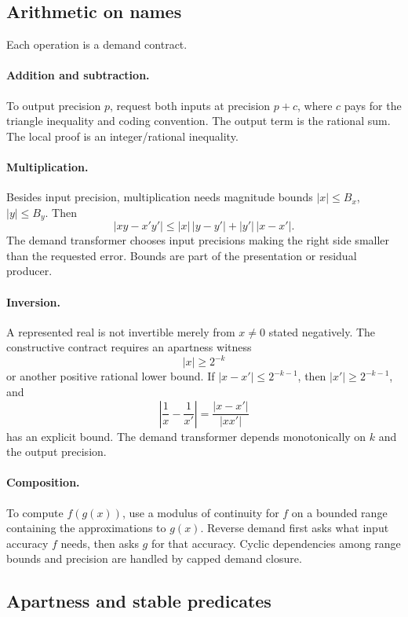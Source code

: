 \subsection{Arithmetic on names}

Each operation is a demand contract.

\paragraph{Addition and subtraction.}
To output precision \(p\), request both inputs at precision \(p+c\), where \(c\) pays for the triangle inequality and coding convention.  The output term is the rational sum.  The local proof is an integer/rational inequality.

\paragraph{Multiplication.}
Besides input precision, multiplication needs magnitude bounds \(|x|\le B_x\), \(|y|\le B_y\).  Then
\[
|xy-x'y'|\le |x|\,|y-y'|+|y'|\,|x-x'|.
\]
The demand transformer chooses input precisions making the right side smaller than the requested error.  Bounds are part of the presentation or residual producer.

\paragraph{Inversion.}
A represented real is not invertible merely from \(x\ne0\) stated negatively.  The constructive contract requires an apartness witness
\[
  |x|\ge 2^{-k}
\]
or another positive rational lower bound.  If \(|x-x'|\le 2^{-k-1}\), then \(|x'|\ge2^{-k-1}\), and
\[
\left|\frac1x-\frac1{x'}\right|
=\frac{|x-x'|}{|xx'|}
\]
has an explicit bound.  The demand transformer depends monotonically on \(k\) and the output precision.

\paragraph{Composition.}
To compute \(f(g(x))\), use a modulus of continuity for \(f\) on a bounded range containing the approximations to \(g(x)\).  Reverse demand first asks what input accuracy \(f\) needs, then asks \(g\) for that accuracy.  Cyclic dependencies among range bounds and precision are handled by capped demand closure.

\subsection{Apartness and stable predicates}

